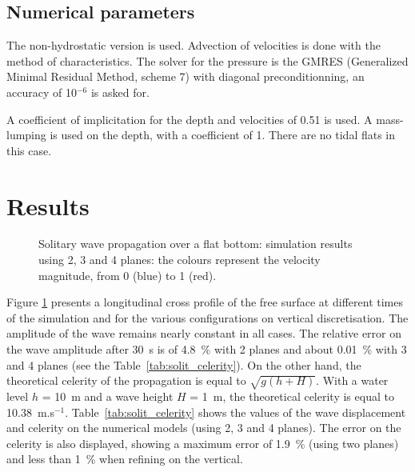 \subsection{Numerical parameters}
%
The non-hydrostatic version is used. Advection of velocities is done with the method of characteristics.
The solver for the pressure is the GMRES (Generalized Minimal Residual Method, scheme 7)
with diagonal preconditionning, an accuracy of 10$^{-6}$ is asked for.

A coefficient of implicitation for the depth and velocities of 0.51 is used.
A mass-lumping is used on the depth, with a coefficient of 1.
There are no tidal flats in this case.
%
\section{Results}
%
\begin{figure}[H]
\begin{center}
\caption{Solitary wave propagation over a flat bottom: simulation results using 2, 3 and 4 planes: the
colours represent the velocity magnitude, from 0 (blue) to 1 (red).}
\label{fig:solit_results}
\end{center}
\end{figure}
%
Figure \ref{fig:solit_results} presents a longitudinal cross profile of the free surface
at different times of the simulation and for the various configurations
on vertical discretisation.
The amplitude of the wave remains nearly constant in all cases.
The relative error on the wave amplitude after 30~s is of 4.8~\% with 2 planes and about 0.01~\%
with 3 and 4 planes (see the Table~\ref{tab:solit_celerity}).
On the other hand, the theoretical celerity of the propagation is equal to $\sqrt{g(h+H)}$.
With a water level $h$ = 10~m and a wave height $H$ = 1~m,
the theoretical celerity is equal to 10.38~m.s$^{-1}$.
Table~\ref{tab:solit_celerity} shows the values of the wave displacement and celerity
on the numerical models (using 2, 3 and 4 planes). The error on the celerity is also
displayed, showing a maximum error of 1.9~\% (using two planes) and less than 1~\% when refining on the vertical.
